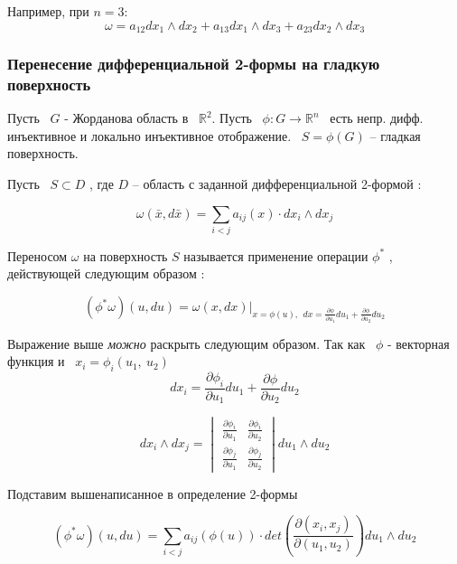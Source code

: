 	\vspace{1em}
	
	Например, при $n = 3$:
	\[
		\omega = a_{12} dx_1 \wedge dx_2 + a_{13} dx_1 \wedge dx_3 + a_{23} dx_2 \wedge dx_3
	\] 
	
\subsubsection{Перенесение дифференциальной 2-формы на гладкую поверхность}
	
	Пусть ~$G$ - Жорданова область в ~$\mathbb{R}^2$. Пусть ~$\phi: G \rightarrow \mathbb{R}^n$~ есть непр. дифф. инъективное и локально инъективное отображение. ~$S = \phi(G)$ -- гладкая поверхность. 
	
	Пусть ~$S \subset D$ , где $D$ -- область с заданной дифференциальной 2-формой :
	
	\[
	\omega(\bar{x}, d\bar{x}) = \sum_{i<j} a_{ij}(x) \cdot dx_i \wedge dx_j		
	\]
	
	\begin{definition*} 
		Переносом $\omega$ на поверхность $S$ называется применение операции $\phi^*$ , действующей следующим образом :
		
		\[
		(\phi^* \omega)(u, du) = \omega(x, dx) \Biggl|_{
				x = \phi(u), ~~
				dx = \frac{\partial \phi}{\partial u_1}du_1 + \frac{\partial \phi}{\partial u_2}du_2
		}
		\]
		
	\end{definition*}
	
	\vspace{1em}
	
	Выражение выше \textit{можно} раскрыть следующим образом. Так как ~$\phi$ - векторная функция и ~$x_i = \phi_i(u_1, ~u_2)$
	\[
	dx_i = \frac{\partial \phi_i}{\partial u_1}du_1 + \frac{\partial \phi}{\partial u_2}du_2
	\]
	
	\[
	dx_i \wedge dx_j = 
	\begin{vmatrix} 
	\frac{\partial \phi_i}{\partial u_1} & \frac{\partial \phi_i}{\partial u_2} \\
	\frac{\partial \phi_j}{\partial u_1} & \frac{\partial \phi_j}{\partial u_2}
	\end{vmatrix} du_1 \wedge du_2
	\]
	
	Подставим вышенаписанное в определение 2-формы
	
	\[
	(\phi^* \omega)(u, du) = \sum_{i<j} a_{ij}(\phi(u)) \cdot 
	det \left( \frac{\partial (x_i, x_j)}{\partial (u_1, u_2)}	\right) du_1 \wedge du_2
	\]



